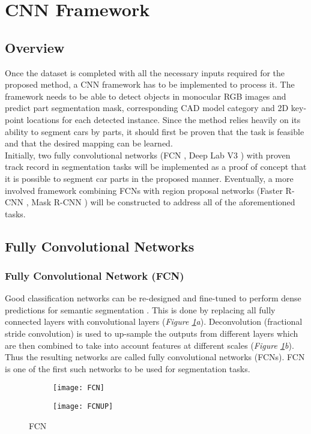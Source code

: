 \documentclass[main.tex]{subfiles}
\begin{document}
\section{CNN Framework}
\subsection{Overview}
Once the dataset is completed with all the necessary inputs required for the proposed method, a CNN framework has to be implemented to process it. The framework needs to be able to detect objects in monocular RGB images and predict part segmentation mask, corresponding CAD model category and 2D key-point locations for each detected instance. Since the method relies heavily on its ability to segment cars by parts, it should first be proven that the task is feasible and that the desired mapping can be learned.\\
\indent Initially, two fully convolutional networks (FCN \cite{Shelhamer2016}, Deep Lab V3 \cite{Chen2017}) with proven track record in segmentation tasks will be implemented as a proof of concept that it is possible to segment car parts in the proposed manner. Eventually, a more involved framework combining FCNs with region proposal networks (Faster R-CNN \cite{Ren2017}, Mask R-CNN \cite{He2017}) will be constructed to address all of the aforementioned tasks.
\subsection{Fully Convolutional Networks}
\subsubsection{Fully Convolutional Network (FCN)}
Good classification networks can be re-designed and fine-tuned to perform dense predictions for semantic segmentation \cite{Shelhamer2016}. This is done by replacing all fully connected layers with convolutional layers (\emph{Figure \ref{fig:fcn}a}). Deconvolution (fractional stride convolution) is used to up-sample the outputs from different layers which are then combined to take into account features at different scales (\emph{Figure \ref{fig:fcn}b}). Thus the resulting networks are called fully convolutional networks (FCNs). FCN \cite{Shelhamer2016} is one of the first such networks to be used for segmentation tasks.
\begin{figure}[h]
\centering
\begin{subfigure}[c]{0.5\textwidth}
\centering
\texttt{[image: FCN]}
\caption{}
\end{subfigure}%
\begin{subfigure}[c]{0.5\textwidth}
\centering
\texttt{[image: FCNUP]}
\caption{}
\end{subfigure}%
\caption{FCN \cite{Shelhamer2016}}
\label{fig:fcn}
\end{figure}
\end{document}
